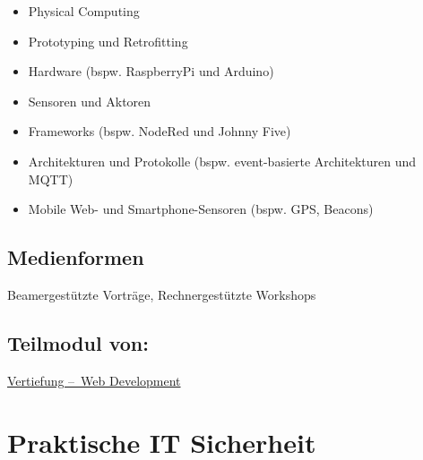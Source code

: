 \begin{itemize}
\tightlist
\item
  Physical Computing
\item
  Prototyping und Retrofitting
\item
  Hardware (bspw. RaspberryPi und Arduino)
\item
  Sensoren und Aktoren
\item
  Frameworks (bspw. NodeRed und Johnny Five)
\item
  Architekturen und Protokolle (bspw. event-basierte Architekturen und
  MQTT)
\item
  Mobile Web- und Smartphone-Sensoren (bspw. GPS, Beacons)
\end{itemize}

\hypertarget{medienformenpathlabelmi-2017modulbeschreibungen-bachelorba_wd_internet-of-things}{%
\section*{Medienformen\label{/mi-2017/modulbeschreibungen-bachelor/BA_WD_Internet-of-things}}\label{medienformenpathlabelmi-2017modulbeschreibungen-bachelorba_wd_internet-of-things}}

Beamergestützte Vorträge, Rechnergestützte Workshops

\hypertarget{teilmodul-vonpathlabelmi-2017modulbeschreibungen-bachelorba_wd_internet-of-things}{%
\section*{Teilmodul
von:\label{/mi-2017/modulbeschreibungen-bachelor/BA_WD_Internet-of-things}}\label{teilmodul-vonpathlabelmi-2017modulbeschreibungen-bachelorba_wd_internet-of-things}}

\hyperref[/mi-2017/modulbeschreibungen-bachelor/BA_Vertiefung-Web_Development]{Vertiefung – Web Development}

\hypertarget{praktische-it-sicherheitpathlabelmi-2017modulbeschreibungen-bachelorba_wd_praktische-it-sicherheit}{%
\chapter{Praktische IT
Sicherheit\label{/mi-2017/modulbeschreibungen-bachelor/BA_WD_Praktische-IT-Sicherheit}}\label{praktische-it-sicherheitpathlabelmi-2017modulbeschreibungen-bachelorba_wd_praktische-it-sicherheit}}

